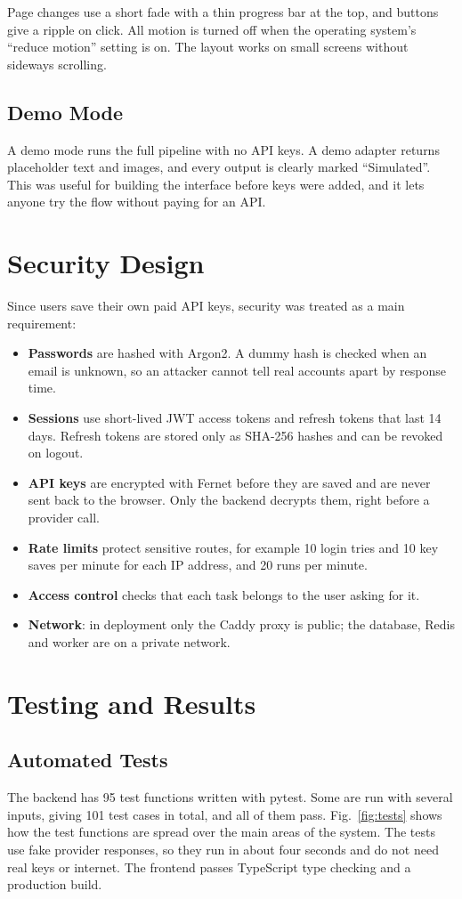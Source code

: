 \documentclass[conference]{IEEEtran}
\begin{document}
Page changes use a short fade with a thin progress bar at the top, and buttons give a ripple on click. All
motion is turned off when the operating system's ``reduce motion'' setting is on. The layout works on
small screens without sideways scrolling.

\subsection{Demo Mode}
A demo mode runs the full pipeline with no API keys. A demo adapter returns placeholder text and images,
and every output is clearly marked ``Simulated''. This was useful for building the interface before keys
were added, and it lets anyone try the flow without paying for an API.

\section{Security Design}
Since users save their own paid API keys, security was treated as a main requirement:
\begin{itemize}
\item \textbf{Passwords} are hashed with Argon2. A dummy hash is checked when an email is unknown, so an
attacker cannot tell real accounts apart by response time.
\item \textbf{Sessions} use short-lived JWT access tokens and refresh tokens that last 14 days. Refresh
tokens are stored only as SHA-256 hashes and can be revoked on logout.
\item \textbf{API keys} are encrypted with Fernet before they are saved and are never sent back to the
browser. Only the backend decrypts them, right before a provider call.
\item \textbf{Rate limits} protect sensitive routes, for example 10 login tries and 10 key saves per
minute for each IP address, and 20 runs per minute.
\item \textbf{Access control} checks that each task belongs to the user asking for it.
\item \textbf{Network}: in deployment only the Caddy proxy is public; the database, Redis and worker are
on a private network.
\end{itemize}

\section{Testing and Results}

\subsection{Automated Tests}
The backend has 95 test functions written with pytest. Some are run with several inputs, giving 101 test
cases in total, and all of them pass. Fig.~\ref{fig:tests} shows how the test functions are spread over
the main areas of the system. The tests use fake provider responses, so they run in about four seconds
and do not need real keys or internet. The frontend passes TypeScript type checking and a production
build.
\end{document}
